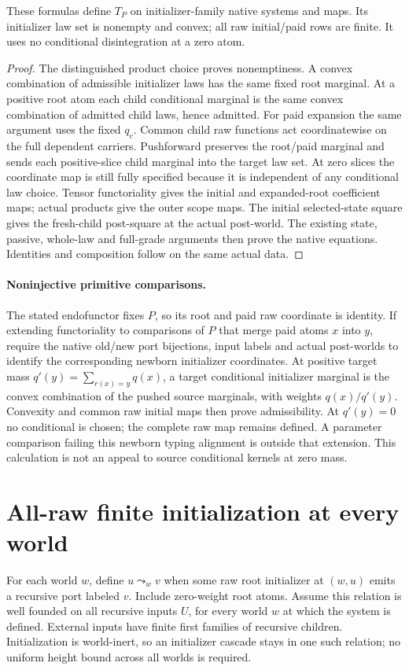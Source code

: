 \documentclass[11pt]{article}
\begin{document}
\begin{proposition}
These formulas define $T_P$ on initializer-family native systems and maps. Its initializer law set is nonempty and convex; all raw initial/paid rows are finite. It uses no conditional disintegration at a zero atom.
\end{proposition}
\begin{proof}
The distinguished product choice proves nonemptiness. A convex combination of admissible initializer laws has the same fixed root marginal. At a positive root atom each child conditional marginal is the same convex combination of admitted child laws, hence admitted. For paid expansion the same argument uses the fixed $q_c$. Common child raw functions act coordinatewise on the full dependent carriers. Pushforward preserves the root/paid marginal and sends each positive-slice child marginal into the target law set. At zero slices the coordinate map is still fully specified because it is independent of any conditional law choice. Tensor functoriality gives the initial and expanded-root coefficient maps; actual products give the outer scope maps. The initial selected-state square gives the fresh-child post-square at the actual post-world. The existing state, passive, whole-law and full-grade arguments then prove the native equations. Identities and composition follow on the same actual data.\end{proof}

\paragraph{Noninjective primitive comparisons.} The stated endofunctor fixes $P$, so its root and paid raw coordinate is identity. If extending functoriality to comparisons of $P$ that merge paid atoms $x$ into $y$, require the native old/new port bijections, input labels and actual post-worlds to identify the corresponding newborn initializer coordinates. At positive target mass $q'(y)=\sum_{r(x)=y}q(x)$, a target conditional initializer marginal is the convex combination of the pushed source marginals, with weights $q(x)/q'(y)$. Convexity and common raw initial maps then prove admissibility. At $q'(y)=0$ no conditional is chosen; the complete raw map remains defined. A parameter comparison failing this newborn typing alignment is outside that extension. This calculation is not an appeal to source conditional kernels at zero mass.

\section{All-raw finite initialization at every world}
For each world $w$, define $u\leadsto_wv$ when some raw root initializer at $(w,u)$ emits a recursive port labeled $v$. Include zero-weight root atoms. Assume this relation is well founded on all recursive inputs $U$, for every world $w$ at which the system is defined. External inputs have finite first families of recursive children. Initialization is world-inert, so an initializer cascade stays in one such relation; no uniform height bound across all worlds is required.
\end{document}

